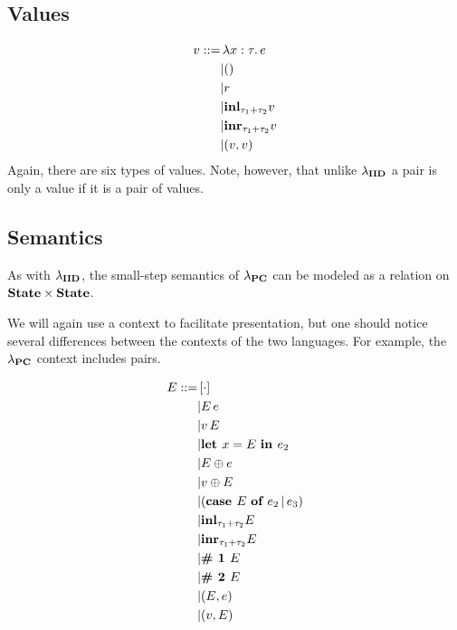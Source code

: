 \documentclass{article}
\begin{document}
		\subsection{Values}
			\begin{equation*}
				\begin{split}
					v ::=
					&\, \lambda x:\tau.\, e \\
					&| () \\
					&| r \\
					&| \text{\bf inl}_{\tau_1 + \tau_2} v \\
					&| \text{\bf inr}_{\tau_1 + \tau_2} v \\
					&| (v, v) \\
				\end{split}
			\end{equation*}
			Again, there are six types of values. 
			Note, however, that unlike $\lambda_{\bf IID}$ a pair is only a value if it is a pair of values.
		
		\subsection{Semantics}

		As with $\lambda_{\bf IID}$, the small-step semantics of $\lambda_{\bf PC}$ can be modeled as a relation on $\bf State \times State$.
		
		We will again use a context to facilitate presentation, but one should notice several differences between the contexts of the two languages. 
		For example, the $\lambda_{\bf PC}$ context includes pairs.
		
		\begin{equation*}
			\begin{split}
				E ::=
				&\, [\cdot] \\
				&| E\, e \\
				&| v\, E \\
				&| \text{\bf let } x = E \text{ \bf in } e_2 \\
				&| E \oplus e \\
				&| v \oplus E \\
				&| (\text{\bf case } E \text{ \bf of } e_2 \,|\, e_3) \\
				&| {\bf inl}_{\tau_1 + \tau_2} E \\
				&| {\bf inr}_{\tau_1 + \tau_2} E \\
				&| \text{\bf \# 1 } E \\
				&| \text{\bf \# 2 } E \\
				&| (E, e) \\
				&| (v, E) \\
			\end{split}
		\end{equation*}
		
\end{document}
